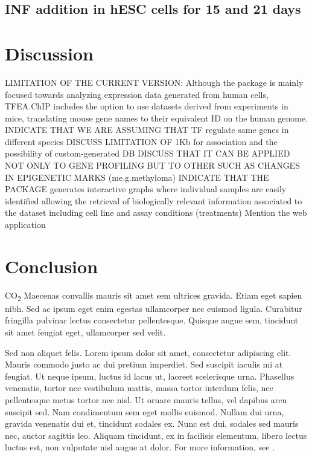 \documentclass[10pt,letterpaper]{article}
\begin{document}
	\subsection{INF addition in hESC cells for 15 and 21 days}
	
	\section*{Discussion}
	LIMITATION OF THE CURRENT VERSION: Although the package is mainly focused towards analyzing expression data generated from human cells, TFEA.ChIP includes the option to use datasets derived from experiments in mice, translating mouse gene names to their equivalent ID on the human genome. INDICATE THAT WE ARE ASSUMING THAT TF regulate same genes in different species
	DISCUSS LIMITATION OF 1Kb for association and the possibility of custom-generated DB
	DISCUSS THAT IT CAN BE APPLIED NOT ONLY TO GENE PROFILING BUT TO OTHER SUCH AS CHANGES IN EPIGENETIC MARKS (me.g.methyloma)
	INDICATE THAT THE PACKAGE generates interactive graphs where individual samples are easily identified allowing the retrieval of biologically relevant information associated to the dataset including cell line and assay conditions (treatments)
	Mention the web application
	\section*{Conclusion}
	
	CO\textsubscript{2} Maecenas convallis mauris sit amet sem ultrices gravida. Etiam eget sapien nibh. Sed ac ipsum eget enim egestas ullamcorper nec euismod ligula. Curabitur fringilla pulvinar lectus consectetur pellentesque. Quisque augue sem, tincidunt sit amet feugiat eget, ullamcorper sed velit. 
	
	Sed non aliquet felis. Lorem ipsum dolor sit amet, consectetur adipiscing elit. Mauris commodo justo ac dui pretium imperdiet. Sed suscipit iaculis mi at feugiat. Ut neque ipsum, luctus id lacus ut, laoreet scelerisque urna. Phasellus venenatis, tortor nec vestibulum mattis, massa tortor interdum felis, nec pellentesque metus tortor nec nisl. Ut ornare mauris tellus, vel dapibus arcu suscipit sed. Nam condimentum sem eget mollis euismod. Nullam dui urna, gravida venenatis dui et, tincidunt sodales ex. Nunc est dui, sodales sed mauris nec, auctor sagittis leo. Aliquam tincidunt, ex in facilisis elementum, libero lectus luctus est, non vulputate nisl augue at dolor. For more information, see .
	
\end{document}
